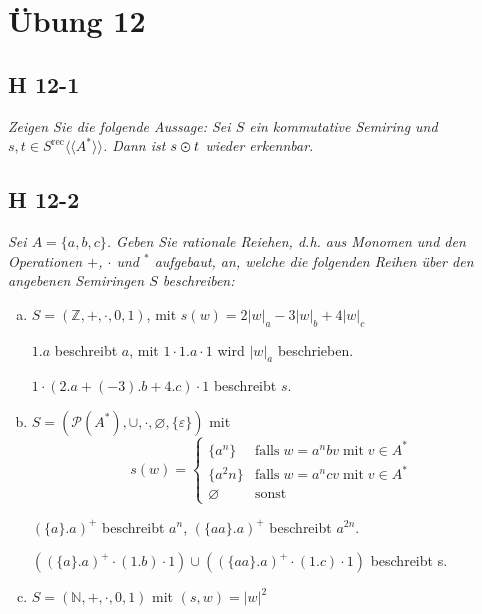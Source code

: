 \documentclass{scrartcl}
\begin{document}
\section{Übung 12}

\subsection{H 12-1}

\textsl{Zeigen Sie die folgende Aussage: Sei $S$ ein kommutative Semiring und $s, t \in S^{\text{rec}}\langle\langle A^* \rangle\rangle$. Dann ist $s \varodot t$ wieder erkennbar.}

\subsection{H 12-2}

\textsl{Sei $A = \{a, b, c\}$. Geben Sie rationale Reiehen, d.h. aus Monomen und den Operationen $+$, $\cdot$ und ${}^*$ aufgebaut, an, welche die folgenden Reihen über den angebenen Semiringen $S$ beschreiben:}

\begin{enumerate}[(a)]
    \item $S = (\mathbb{Z}, +, \cdot, 0, 1)$, mit $s(w) = 2|w|_a -3|w|_b + 4|w|_c$

      $1.a$ beschreibt $a$, mit $1 \cdot 1.a \cdot 1$ wird $|w|_a$ beschrieben.

      $1 \cdot \left(2.a + \left(-3\right).b + 4.c\right) \cdot 1$ beschreibt $s$.

    \item $S = (\mathcal{P}(A^*), \cup, \cdot, \varnothing, \{\varepsilon\})$ mit
      \begin{equation*}
        s(w) = \begin{cases}
          \{a^n\}     &\text{falls}\;w = a^nbv\;\text{mit}\;v \in A^*\\
          \{a^2n\}    &\text{falls}\;w=a^ncv\;\text{mit}\;v \in A^*\\
          \varnothing &\text{sonst}
        \end{cases}
      \end{equation*}

      $(\{a\}.a)^+$ beschreibt $a^n$, $(\{aa\}.a)^+$ beschreibt $a^{2n}$.

      $\left(\left(\{a\}.a\right)^+ \cdot \left(1.b\right) \cdot 1\right) \cup \left(\left(\{aa\}.a\right)^+ \cdot \left(1.c\right) \cdot 1\right)$ beschreibt s.

    \item $S = (\mathbb{N}, +, \cdot, 0, 1)$ mit $(s, w) = |w|^2$
\end{enumerate}
\end{document}
